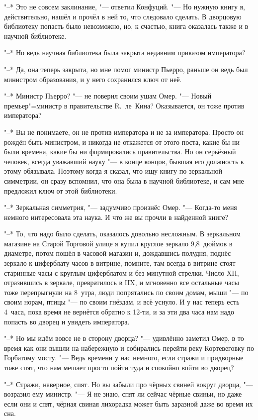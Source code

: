 "--* Это не совсем заклинание, "--- ответил Конфуций.
"--- Но нужную книгу я, действительно, нашёл и прочёл в ней то, что следовало
сделать.
В дворцовую библиотеку попасть было невозможно, но, к счастью, книга оказалась
также и в научной библиотеке.

"--* Но ведь научная библиотека была закрыта недавним приказом императора?

"--* Да, она теперь закрыта, но мне помог министр Пьерро, раньше он ведь был
министром образования, и у него сохранился ключ от неё.

"--* Министр Пьерро? "--- не поверил своим ушам Омер.
"--- Новый премьер"=министр в правительстве R.~ле~Кина?
Оказывается, он тоже против императора?

"--* Вы не понимаете, он не против императора и не за императора.
Просто он рождён быть министром, и никогда не откажется от этого поста, какие бы
ни были времена, какие бы ни формировались правительства.
Но он серьёзный человек, всегда уважавший науку "--- в конце концов, бывшая его
должность к этому обязывала.
Поэтому когда я сказал, что ищу книгу по зеркальной симметрии, он сразу
вспомнил, что она была в научной библиотеке, и сам мне предложил ключ от этой
библиотеки.

"--* Зеркальная симметрия, "--- задумчиво произнёс Омер.
"--- Когда-то меня немного интересовала эта наука.
И что же вы прочли в найденной книге?

"--* То, что надо было сделать, оказалось довольно несложным.
В зеркальном магазине на Старой Торговой улице я купил круглое зеркало 9{,}8~дюймов
в диаметре, потом пошёл в часовой магазин и, дождавшись полудня, поднёс
зеркало к циферблату часов в витрине, помните, там всегда в витрине стоят
старинные часы с круглым циферблатом и без минутной стрелки.
Число XII, отразившись в зеркале, превратилось в IIX, и мгновенно все остальные
часы тоже перепрыгнули на 8~утра, люди попрятались по своим домам, мыши "--- по
своим норам, птицы "--- по своим гнёздам, и всё уснуло.
И у нас теперь есть 4~часа, пока время не вернётся обратно к 12-ти, и за эти два
часа нам надо попасть во дворец и увидеть императора.

"--* Но мы идём вовсе не в сторону дворца? "--- удивлённо заметил Омер, в то
время как они вышли на набережную и собирались перейти реку Кортевеговку по
Горбатому мосту.
"--- Ведь времени у нас немного, если стражи и придворные тоже спят, что нам
мешает просто пойти туда и спокойно войти во дворец?

"--* Стражи, наверное, спят.
Но вы забыли про чёрных свиней вокруг дворца, "--- возразил ему министр.
"--- Я не знаю, спят ли сейчас чёрные свиньи, но даже если они и спят, чёрная
свиная лихорадка может быть заразной даже во время их сна.

